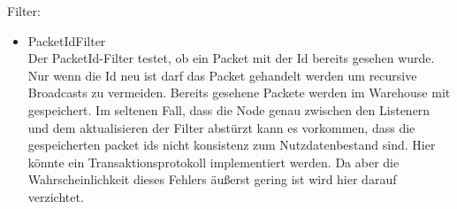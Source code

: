     Filter:
    \begin{itemize}
        \item PacketIdFilter\\
            Der PacketId-Filter testet, ob ein Packet mit der Id bereits gesehen wurde. Nur wenn die Id neu ist darf das Packet gehandelt werden um recursive Broadcasts zu vermeiden. Bereits gesehene Packete werden im Warehouse mit gespeichert. Im seltenen Fall, dass die Node genau zwischen den Listenern und dem aktualisieren der Filter abstürzt kann es vorkommen, dass die gespeicherten packet ids nicht konsistenz zum Nutzdatenbestand sind. Hier könnte ein Transaktionsprotokoll implementiert werden. Da aber die Wahrscheinlichkeit dieses Fehlers äußerst gering ist wird hier darauf verzichtet.
            
    \end{itemize}
   


